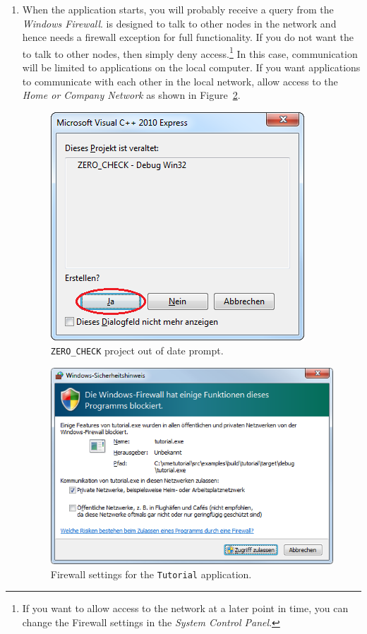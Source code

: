 \begin{enumerate}
	\item When the application starts, you will probably receive a query from the \emph{Windows Firewall}.
		\xme is designed to talk to other nodes in the network and hence needs a firewall exception for full functionality.
		If you do not want the \xme to talk to other nodes, then simply deny access.\footnote{%
		If you want to allow access to the network at a later point in time,
		you can change the Firewall settings in the \emph{System Control Panel}.}
		In this case, communication will be limited to \xme applications on the local computer.
		If you want \xme applications to communicate with each other in the local network,
		allow access to the \emph{Home or Company Network} as shown in Figure~\ref{fig:firewall_tutorial}.

\begin{figure}[htpb]
	\centering
	\includegraphics[scale=0.75]{figures/PNG/vs_zero_check_edited.png}
	\caption{\texttt{ZERO\_CHECK} project out of date prompt.}
	\label{fig:vs_zero_check}
\end{figure}

\begin{figure}[htpb]
	\centering
	\includegraphics[scale=0.75]{figures/PNG/firewall_tutorial.png}
	\caption{Firewall settings for the \texttt{Tutorial} application.}
	\label{fig:firewall_tutorial}
\end{figure}

\end{enumerate}

